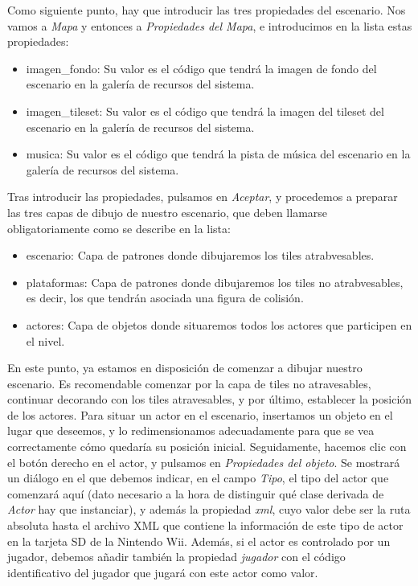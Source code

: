 Como siguiente punto, hay que introducir las tres propiedades del escenario. Nos vamos a \emph{Mapa} y entonces a \emph{Propiedades del Mapa}, e introducimos en la lista estas propiedades:

\begin{itemize}
\item imagen\_fondo: Su valor es el código que tendrá la imagen de fondo del escenario en la galería de recursos del sistema.
\item imagen\_tileset: Su valor es el código que tendrá la imagen del tileset del escenario en la galería de recursos del sistema.
\item musica: Su valor es el código que tendrá la pista de música del escenario en la galería de recursos del sistema.
\end{itemize}

Tras introducir las propiedades, pulsamos en \emph{Aceptar}, y procedemos a preparar las tres capas de dibujo de nuestro escenario, que deben llamarse obligatoriamente como se describe en la lista:

\begin{itemize}
\item escenario: Capa de patrones donde dibujaremos los tiles atrabvesables.
\item plataformas: Capa de patrones donde dibujaremos los tiles no atrabvesables, es decir, los que tendrán asociada una figura de colisión.
\item actores: Capa de objetos donde situaremos todos los actores que participen en el nivel.
\end{itemize}

En este punto, ya estamos en disposición de comenzar a dibujar nuestro escenario. Es recomendable comenzar por la capa de tiles no atravesables, continuar decorando con los tiles atravesables, y por último, establecer la posición de los actores. Para situar un actor en el escenario, insertamos un objeto en el lugar que deseemos, y lo redimensionamos adecuadamente para que se vea correctamente cómo quedaría su posición inicial. Seguidamente, hacemos clic con el botón derecho en el actor, y pulsamos en \emph{Propiedades del objeto}. Se mostrará un diálogo en el que debemos indicar, en el campo \emph{Tipo}, el tipo del actor que comenzará aquí (dato necesario a la hora de distinguir qué clase derivada de \emph{Actor} hay que instanciar), y además la propiedad \emph{xml}, cuyo valor debe ser la ruta absoluta hasta el archivo XML que contiene la información de este tipo de actor en la tarjeta SD de la Nintendo Wii. Además, si el actor es controlado por un jugador, debemos añadir también la propiedad \emph{jugador} con el código identificativo del jugador que jugará con este actor como valor.\\

